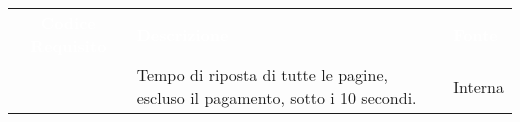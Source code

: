 \renewcommand{\arraystretch}{1.5}



\begin{longtable}{c C{9.5cm} C{2.5cm}} 
	
	\textcolor{white}{\textbf{Codice Requisito}}&
	\textcolor{white}{\textbf{Descrizione}}&
	\textcolor{white}{\textbf{Fonte}}\\

	 & Tempo di riposta di tutte le pagine, escluso il pagamento, sotto i 10 secondi. & Interna \\

\end{longtable}
